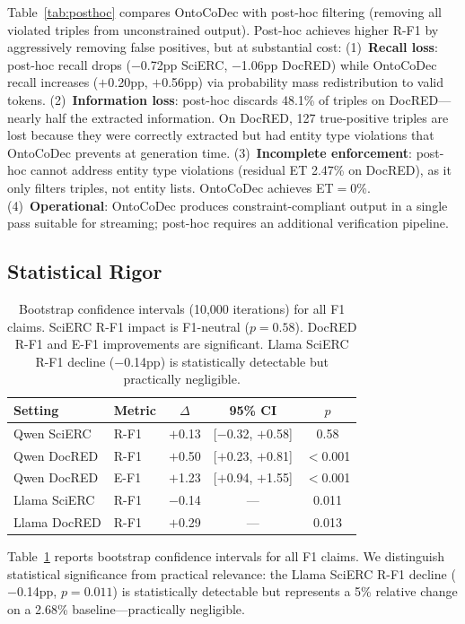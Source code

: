 \documentclass[11pt,a4paper]{article}
\newcommand{\sys}{OntoCoDec}
\begin{document}
Table~\ref{tab:posthoc} compares \sys{} with post-hoc filtering (removing all violated triples from unconstrained output).
Post-hoc achieves higher R-F1 by aggressively removing false positives, but at substantial cost:
(1)~\textbf{Recall loss}: post-hoc recall drops ($-$0.72pp SciERC, $-$1.06pp DocRED) while \sys{} recall increases ($+$0.20pp, $+$0.56pp) via probability mass redistribution to valid tokens.
(2)~\textbf{Information loss}: post-hoc discards 48.1\% of triples on DocRED---nearly half the extracted information. On DocRED, 127 true-positive triples are lost because they were correctly extracted but had entity type violations that \sys{} prevents at generation time.
(3)~\textbf{Incomplete enforcement}: post-hoc cannot address entity type violations (residual ET 2.47\% on DocRED), as it only filters triples, not entity lists. \sys{} achieves ET$=$0\%.
(4)~\textbf{Operational}: \sys{} produces constraint-compliant output in a single pass suitable for streaming; post-hoc requires an additional verification pipeline.

\subsection{Statistical Rigor}

\begin{table}[t]
\centering
\small
\begin{tabular}{llccc}
\toprule
\textbf{Setting} & \textbf{Metric} & \textbf{$\Delta$} & \textbf{95\% CI} & \textbf{$p$} \\
\midrule
Qwen SciERC & R-F1 & $+$0.13 & [$-$0.32, $+$0.58] & 0.58 \\
Qwen DocRED & R-F1 & $+$0.50 & [$+$0.23, $+$0.81] & ${<}$0.001 \\
Qwen DocRED & E-F1 & $+$1.23 & [$+$0.94, $+$1.55] & ${<}$0.001 \\
Llama SciERC & R-F1 & $-$0.14 & --- & 0.011 \\
Llama DocRED & R-F1 & $+$0.29 & --- & 0.013 \\
\bottomrule
\end{tabular}
\caption{Bootstrap confidence intervals (10,000 iterations) for all F1 claims. SciERC R-F1 impact is F1-neutral ($p{=}0.58$). DocRED R-F1 and E-F1 improvements are significant. Llama SciERC R-F1 decline ($-$0.14pp) is statistically detectable but practically negligible.}
\label{tab:bootstrap}
\end{table}

Table~\ref{tab:bootstrap} reports bootstrap confidence intervals for all F1 claims.
We distinguish statistical significance from practical relevance: the Llama SciERC R-F1 decline ($-$0.14pp, $p{=}0.011$) is statistically detectable but represents a 5\% relative change on a 2.68\% baseline---practically negligible.
\end{document}
